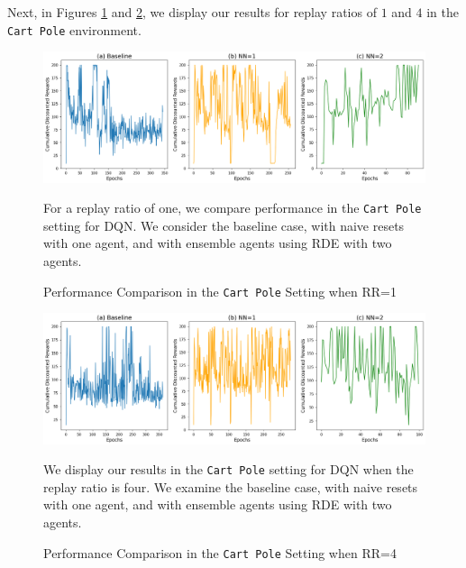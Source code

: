 \documentclass[base]{subfiles}
\begin{document}
\clearpage

Next, in Figures \ref{fig:cp_rr1} and \ref{fig:cp_rr4}, we display our results for replay ratios of $1$ and $4$ in the \texttt{Cart Pole} environment.

\begin{figure}[h!]
    \centering
    \caption{Performance Comparison in the \texttt{Cart Pole} Setting when RR=1}
    \label{fig:cp_rr1}
    \includegraphics[width = 1 \linewidth]{cp_RR1.png}
    \begin{flushleft} For a replay ratio of one, we compare performance in the \texttt{Cart Pole} setting for DQN. We consider the baseline case, with naive resets with one agent, and with ensemble agents using RDE with two agents. \end{flushleft}
\end{figure}

\begin{figure}[h!]
    \centering
    \caption{Performance Comparison in the \texttt{Cart Pole} Setting when RR=4}
    \label{fig:cp_rr4}
    \includegraphics[width = 1 \linewidth]{cp_RR4.png}
    \begin{flushleft} We display our results in the \texttt{Cart Pole} setting for DQN when the replay ratio is four. We examine the baseline case, with naive resets with one agent, and with ensemble agents using RDE with two agents. \end{flushleft}
\end{figure}
\end{document}
